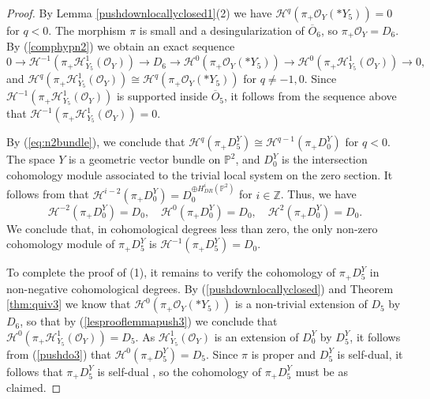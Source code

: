 \documentclass[11pt,reqno]{amsart}
\newcommand{\mc}[1]{\mathcal{#1}}
\newcommand{\ol}[1]{\overline{#1}}
\numberwithin{equation}{section}
\begin{document}
\begin{proof}
By Lemma \ref{pushdownlocallyclosed1}(2) we have $\mc{H}^q(\pi_{+}\mathcal{O}_Y(\ast Y_5))=0$ for $q<0$. The morphism $\pi$ is small and a desingularization of $\ol{O}_6$, so $\pi_{+}\mc{O}_Y=D_6$. By (\ref{comphypn2}) we obtain an  exact sequence
\begin{equation}\label{lesprooflemmapush3}
0\to \mc{H}^{-1}(\pi_{+}\mathscr{H}^1_{Y_5}(\mc{O}_Y))\to D_6\to \mc{H}^0(\pi_{+}\mathcal{O}_Y(\ast Y_5))\to \mc{H}^{0}(\pi_{+}\mathscr{H}^1_{Y_5}(\mc{O}_Y))\to 0,
\end{equation}
and $\mc{H}^{q}(\pi_{+}\mathscr{H}^1_{Y_5}(\mc{O}_Y))\cong \mc{H}^q(\pi_{+}\mathcal{O}_Y(\ast Y_5))$ for $q\neq -1,0$. Since $\mc{H}^{-1}(\pi_{+}\mathscr{H}^1_{Y_5}(\mc{O}_Y))$ is supported inside $\ol{O}_5$, it follows from the sequence above that $\mc{H}^{-1}(\pi_{+}\mathscr{H}^1_{Y_5}(\mc{O}_Y))=0$.

By (\ref{eq:n2bundle}), we conclude that $\mc{H}^{q}(\pi_{+}D^Y_5)\cong \mc{H}^{q-1}(\pi_{+}D^Y_0)$ for $q<0$. The space $Y$ is a geometric vector bundle on $\mathbb{P}^2$, and $D_0^Y$ is the intersection cohomology module associated to the trivial local system on the zero section. It follows from \cite[Proposition 1.5.28]{htt} that $\mc{H}^{i-2}(\pi_{+}D_0^Y)=D_0^{\oplus H^{i}_{DR}(\mathbb{P}^2)}$ for $i\in\mathbb{Z}$. Thus, we have
\begin{equation}\label{pushdo3}
\mc{H}^{-2}(\pi_{+}D^Y_0)=D_0,\quad \mc{H}^{0}(\pi_{+}D^Y_0)=D_0,\quad \mc{H}^{2}(\pi_{+}D^Y_0)=D_0.
\end{equation}
We conclude that, in cohomological degrees less than zero, the only non-zero cohomology module of $\pi_{+}D_5^Y$ is  $\mc{H}^{-1}(\pi_{+}D^Y_5)=D_0$. 

To complete the proof of (1), it remains to verify the cohomology of $\pi_{+}D_5^Y$ in non-negative cohomological degrees. By (\ref{pushdownlocallyclosed}) and Theorem \ref{thm:quiv3} we know that $\mc{H}^0(\pi_{+}\mathcal{O}_Y(\ast Y_5))$ is a non-trivial extension of $D_5$ by $D_6$, so that by (\ref{lesprooflemmapush3}) we conclude that $\mc{H}^{0}(\pi_{+}\mathscr{H}^1_{Y_5}(\mc{O}_Y))=D_5$. As $\mathscr{H}^1_{Y_5}(\mc{O}_Y)$ is an extension of $D_0^Y$ by $D_5^Y$, it follows from (\ref{pushdo3}) that $\mc{H}^{0}(\pi_{+}D^Y_5)=D_5$. Since $\pi$ is proper and $D_5^Y$ is self-dual, it follows that $\pi_{+}D_5^Y$ is self-dual \cite[Theorem 2.7.2]{htt}, so the cohomology of $\pi_{+}D_5^Y$ must be as claimed.


\end{proof}
\end{document}
